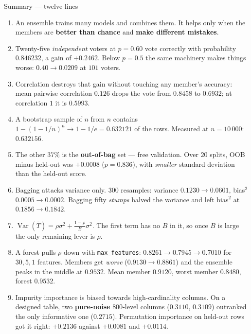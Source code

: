 \documentclass[aspectratio=169]{beamer}
\begin{document}
\begin{frame}[shrink=22]{Summary --- twelve lines}
  \begin{enumerate}\small
    \item An ensemble trains many models and combines them. It helps only
      when the members are \textbf{better than chance} and
      \textbf{make different mistakes}.
    \item Twenty-five \emph{independent} voters at $p = 0.60$ vote correctly
      with probability $\mathbf{0.846232}$, a gain of $+0.2462$. Below
      $p = 0.5$ the same machinery makes things worse: $0.40 \to 0.0209$ at
      $101$ voters.
    \item Correlation destroys that gain without touching any member's
      accuracy: mean pairwise correlation $0.126$ drops the vote from
      $0.8458$ to $\mathbf{0.6932}$; at correlation $1$ it is $0.5993$.
    \item A bootstrap sample of $n$ from $n$ contains
      $1 - (1-1/n)^n \to 1 - 1/e = \mathbf{0.632121}$ of the rows. Measured at
      $n = 10\,000$: $0.632156$.
    \item The other $37\%$ is the \textbf{out-of-bag} set --- free validation.
      Over $20$ splits, OOB minus held-out was $\mathbf{+0.0008}$
      ($p = 0.836$), with \emph{smaller} standard deviation than the held-out
      score.
    \item Bagging attacks variance only. $300$ resamples: variance
      $0.1230 \to \mathbf{0.0601}$, bias$^2$ $0.0005 \to 0.0002$. Bagging
      fifty \emph{stumps} halved the variance and left bias$^2$ at
      $0.1856 \to 0.1842$.
    \item $\operatorname{Var}(\bar T) = \rho\sigma^2 + \frac{1-\rho}{B}\sigma^2$.
      The first term has no $B$ in it, so once $B$ is large the only remaining
      lever is $\rho$.
    \item A forest pulls $\rho$ down with \texttt{max\_features}:
      $0.8261 \to 0.7945 \to 0.7010$ for $30, 5, 1$ features. Members get
      \emph{worse} ($0.9130 \to 0.8861$) and the ensemble peaks in the middle
      at $\mathbf{0.9532}$. Mean member $0.9120$, worst member $0.8480$,
      forest $0.9532$.
    \item Impurity importance is biased towards high-cardinality columns. On
      a designed table, two \textbf{pure-noise} $800$-level columns
      ($0.3110$, $0.3109$) outranked the only informative one ($0.2715$).
      Permutation importance on held-out rows got it right:
      $\mathbf{+0.2136}$ against $+0.0081$ and $+0.0114$.

\end{enumerate}
\end{frame}
\end{document}
